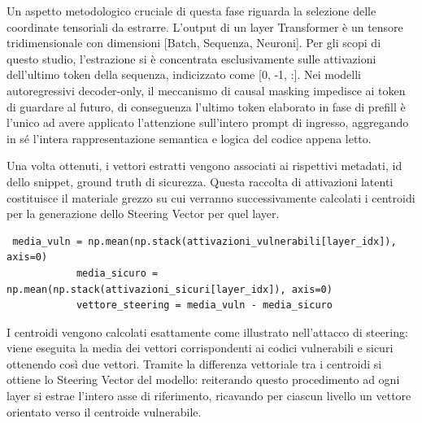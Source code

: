 Un aspetto metodologico cruciale di questa fase riguarda la selezione delle coordinate tensoriali da estrarre. L'output di un layer Transformer è un tensore tridimensionale con dimensioni [Batch, Sequenza, Neuroni]. Per gli scopi di questo studio, l'estrazione si è concentrata esclusivamente sulle attivazioni dell'ultimo token della sequenza, indicizzato come [0, -1, :]. Nei modelli autoregressivi decoder-only, il meccanismo di causal masking impedisce ai token di guardare al futuro, di conseguenza l'ultimo token elaborato in fase di prefill è l'unico ad avere applicato l'attenzione sull'intero prompt di ingresso, aggregando in sé l'intera rappresentazione semantica e logica del codice appena letto.

Una volta ottenuti, i vettori estratti vengono associati ai rispettivi metadati, id dello snippet, ground truth di sicurezza. Questa raccolta di attivazioni latenti costituisce il materiale grezzo su cui verranno successivamente calcolati i centroidi per la generazione dello Steering Vector per quel layer.

\begin{verbatim}
 media_vuln = np.mean(np.stack(attivazioni_vulnerabili[layer_idx]), axis=0)
            media_sicuro = np.mean(np.stack(attivazioni_sicuri[layer_idx]), axis=0)
            vettore_steering = media_vuln - media_sicuro
\end{verbatim}

I centroidi vengono calcolati esattamente come illustrato nell'attacco di steering: viene eseguita la media dei vettori corrispondenti ai codici vulnerabili e sicuri ottenendo così due vettori. 
Tramite la differenza vettoriale tra i centroidi si ottiene lo Steering Vector del modello: reiterando questo procedimento ad ogni layer si estrae l'intero asse di riferimento, ricavando per ciascun livello un vettore orientato verso il centroide vulnerabile.

